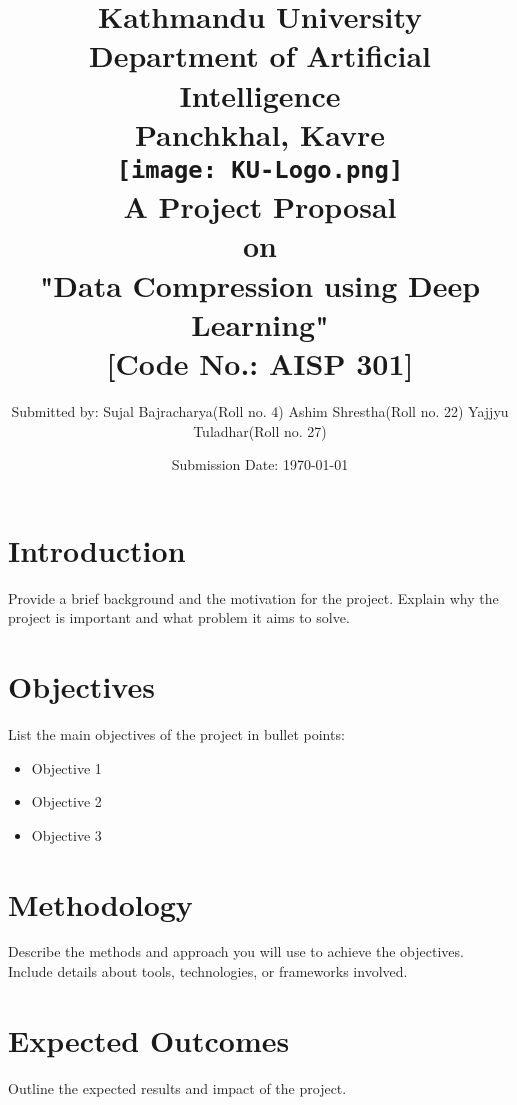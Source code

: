 \documentclass[a4paper,12pt]{article}
\title{
\textbf{
Kathmandu University \\ \large{Department of Artificial Intelligence}\\ \normalsize{Panchkhal, Kavre}\\[2cm]}
    \texttt{[image: KU-Logo.png]}\\[2cm]
    \normalsize{A Project Proposal\\on\\
    \textbf{"Data Compression using Deep Learning"}}\\[0.5cm]
    \normalsize[Code No.: AISP 301]\\[2cm]
}
\author[ ]{\normalsize{
        Submitted by: \linebreak
        Sujal Bajracharya(Roll no. 4)\linebreak
        Ashim Shrestha(Roll no. 22)\linebreak
        Yajjyu Tuladhar(Roll no. 27)
}}
\affil[ ]{\vspace{2cm}}
\affil[ ]{\normalsize{
        Submitted to: \linebreak
        Subodh Acharya \linebreak
        Lecturer \linebreak
        Department of Artificial Intelligence
}}
\date{\normalsize{Submission Date: \today}}
\begin{document}
\maketitle
\thispagestyle{empty}

\newpage
\setcounter{page}{1}

\section{Introduction}
Provide a brief background and the motivation for the project. Explain why the project is important and what problem it aims to solve.

\section{Objectives}
List the main objectives of the project in bullet points:
\begin{itemize}
    \item Objective 1
    \item Objective 2
    \item Objective 3
\end{itemize}

\section{Methodology}
Describe the methods and approach you will use to achieve the objectives. Include details about tools, technologies, or frameworks involved.

\section{Expected Outcomes}
Outline the expected results and impact of the project.
\end{document}
